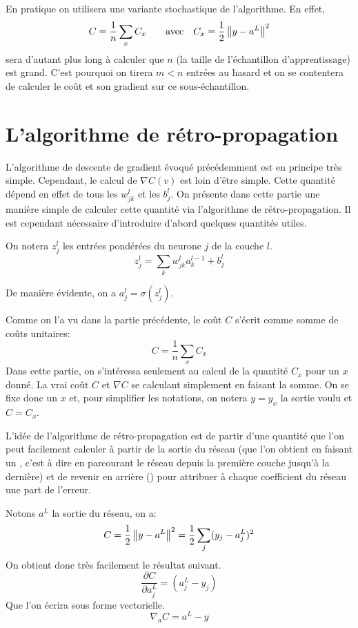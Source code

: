 En pratique on utilisera une variante stochastique de l'algorithme. 
En effet, 
\[
C = \frac{1}{n} \sum_{x} C_x \qquad \text{avec} \quad C_x = \frac{1}{2} \left\Vert y - a^{L}\right\Vert^2
\]
sera d'autant plus long à calculer que $n$ (la taille de l'échantillon d'apprentissage) 
est grand.
C'est pourquoi on tirera $m < n$ entrées au hasard et on se contentera de calculer 
le coût et son gradient sur ce sous-échantillon.



\section{L'algorithme de rétro-propagation}


L'algorithme de descente de gradient évoqué précédemment est en principe 
très simple. Cependant, le calcul de $\nabla C(v)$ est loin d'être simple. 
Cette quantité dépend en effet de tous les $w_{jk}^{l}$ et les $b_{j}^{l}$.
On présente dans cette partie une manière simple de calculer cette quantité 
via l'algorithme de rétro-propagation. 
Il est cependant nécessaire d'introduire d'abord quelques quantités utiles.


\begin{definition}
On notera $z_{j}^{l}$ les entrées pondérées du neurone $j$ de la couche $l$.
\[
z_{j}^{l} = \sum_{k} w_{jk}^{l} a_{k}^{l-1} + b_{j}^{l}
\]
\end{definition}

De manière évidente, on a $a_{j}^{l} = \sigma(z_{j}^{l})$.


Comme on l'a vu dans la partie précédente, le coût $C$ s'écrit comme somme 
de coûts unitaires:
\[
C = \frac{1}{n} \sum_{x} C_x
\]
Dans cette partie, on s'intéressa seulement au calcul de la quantité $C_x$ pour un $x$ donné. 
La vrai coût $C$ et $\nabla C$ se calculant simplement en faisant la somme.
On se fixe donc un $x$ et, pour simplifier les notations, on notera $y = y_x$ 
la sortie voulu et $C = C_x$.

L'idée de l'algorithme de rétro-propagation est de partir d'une quantité que 
l'on peut facilement calculer à partir de la sortie du réseau (que l'on obtient 
en faisant un , c'est à dire en parcourant le réseau depuis la 
première couche jusqu'à la dernière) et de revenir en arrière () 
pour attribuer à chaque coefficient du réseau une part de l'erreur.

Notons $a^L$ la sortie du réseau, on a:
\[
C = \frac{1}{2} \left\Vert y - a^L\right\Vert^2 = \frac{1}{2} \sum_{j} (y_j - a_{j}^{L})^2
\]
On obtient donc très facilement le résultat suivant.
\[
\frac{\partial C}{\partial a_{j}^{L}} = (a_{j}^{L} - y_j)
\]
Que l'on écrira sous forme vectorielle.
\[
\nabla_a C = a^{L} - y 
\]

